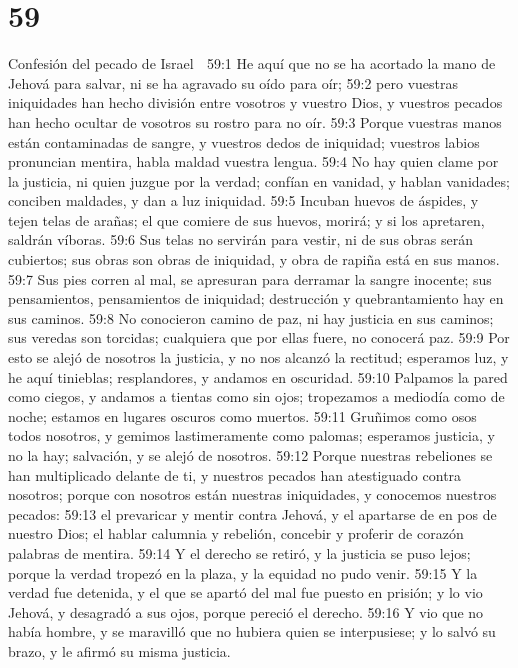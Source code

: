 \chapter{59}

Confesión del pecado de Israel  

59:1 He aquí que no se ha acortado la mano de Jehová para salvar, ni se ha agravado su oído para oír;  
59:2 pero vuestras iniquidades han hecho división entre vosotros y vuestro Dios, y vuestros pecados han hecho ocultar de vosotros su rostro para no oír.  
59:3 Porque vuestras manos están contaminadas de sangre, y vuestros dedos de iniquidad; vuestros labios pronuncian mentira, habla maldad vuestra lengua.  
59:4 No hay quien clame por la justicia, ni quien juzgue por la verdad; confían en vanidad, y hablan vanidades; conciben maldades, y dan a luz iniquidad.  
59:5 Incuban huevos de áspides, y tejen telas de arañas; el que comiere de sus huevos, morirá; y si los apretaren, saldrán víboras.  
59:6 Sus telas no servirán para vestir, ni de sus obras serán cubiertos; sus obras son obras de iniquidad, y obra de rapiña está en sus manos.  
59:7 Sus pies corren al mal, se apresuran para derramar la sangre inocente; sus pensamientos, pensamientos de iniquidad; destrucción y quebrantamiento hay en sus caminos.  
59:8 No conocieron camino de paz, ni hay justicia en sus caminos; sus veredas son torcidas; cualquiera que por ellas fuere, no conocerá paz.  
59:9 Por esto se alejó de nosotros la justicia, y no nos alcanzó la rectitud; esperamos luz, y he aquí tinieblas; resplandores, y andamos en oscuridad.  
59:10 Palpamos la pared como ciegos, y andamos a tientas como sin ojos; tropezamos a mediodía como de noche; estamos en lugares oscuros como muertos.  
59:11 Gruñimos como osos todos nosotros, y gemimos lastimeramente como palomas; esperamos justicia, y no la hay; salvación, y se alejó de nosotros.  
59:12 Porque nuestras rebeliones se han multiplicado delante de ti, y nuestros pecados han atestiguado contra nosotros; porque con nosotros están nuestras iniquidades, y conocemos nuestros pecados:  
59:13 el prevaricar y mentir contra Jehová, y el apartarse de en pos de nuestro Dios; el hablar calumnia y rebelión, concebir y proferir de corazón palabras de mentira.  
59:14 Y el derecho se retiró, y la justicia se puso lejos; porque la verdad tropezó en la plaza, y la equidad no pudo venir.  
59:15 Y la verdad fue detenida, y el que se apartó del mal fue puesto en prisión; y lo vio Jehová, y desagradó a sus ojos, porque pereció el derecho.  
59:16 Y vio que no había hombre, y se maravilló que no hubiera quien se interpusiese; y lo salvó su brazo, y le afirmó su misma justicia. 
